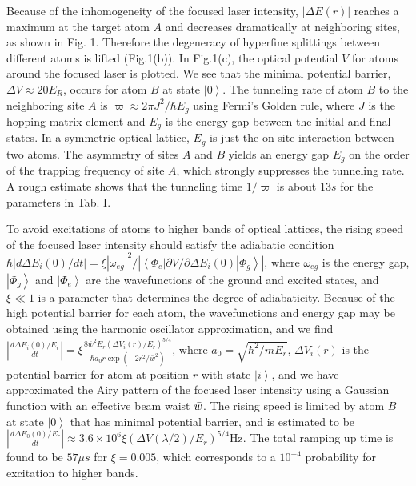 \documentclass[pra,aps,showpacs,twocolumn]{revtex4}
\begin{document}
Because of the inhomogeneity of the focused laser intensity, $\left\vert
\Delta E\left( r\right) \right\vert $ reaches a maximum at the target atom $%
A $ and decreases dramatically at neighboring sites, as shown in Fig. 1.
Therefore the degeneracy of hyperfine splittings between different atoms is
lifted (Fig.1(b)). In Fig.1(c), the optical potential $V$ for atoms around
the focused laser is plotted. We see that the minimal potential barrier, $%
\Delta V\approx 20E_{R}$, occurs for atom $B$ at state $\left\vert
0\right\rangle $. The tunneling rate of atom $B$ to the neighboring site $A$
is $\varpi \approx 2\pi J^{2}/\hbar E_{g}$ using Fermi's Golden rule, where $%
J$ is the hopping matrix element and $E_{g}$ is the energy gap between the
initial and final states. In a symmetric optical lattice, $E_{g}$ is just
the on-site interaction between two atoms. The asymmetry of sites $A$ and $B$
yields an energy gap $E_{g}$ on the order of the trapping frequency of site $%
A$, which strongly suppresses the tunneling rate. A rough estimate shows
that the tunneling time $1/\varpi $ is about $13s$ for the parameters in
Tab. I.

To avoid excitations of atoms to higher bands of optical lattices, the
rising speed of the focused laser intensity should satisfy the adiabatic
condition $\hbar \left\vert d\Delta E_{i}\left( 0\right) /dt\right\vert =\xi
\left\vert \omega _{eg}\right\vert ^{2}/\left\vert \left\langle \Phi
_{e}\right\vert \partial V/\partial \Delta E_{i}\left( 0\right) \left\vert
\Phi _{g}\right\rangle \right\vert $, where $\omega _{eg}$ is the energy
gap, $\left\vert \Phi _{g}\right\rangle $ and $\left\vert \Phi
_{e}\right\rangle $ are the wavefunctions of the ground and excited states,
and $\xi \ll 1$ is a parameter that determines the degree of adiabaticity.
Because of the high potential barrier for each atom, the wavefunctions and
energy gap may be obtained using the harmonic oscillator approximation, and
we find $\left\vert \frac{d\Delta E_{i}\left( 0\right) /E_{r}}{dt}%
\right\vert =\xi \frac{8\bar{w}^{2}E_{r}\left( \Delta V_{i}\left( r\right)
/E_{r}\right) ^{5/4}}{\hbar a_{0}r\exp \left( -2r^{2}/\bar{w}^{2}\right) }$,
where $a_{0}=\sqrt{\hbar ^{2}/mE_{r}}$, $\Delta V_{i}\left( r\right) $ is
the potential barrier for atom at position $r$ with state $\left\vert
i\right\rangle $, and we have approximated the Airy pattern of the focused
laser intensity using a Gaussian function with an effective beam waist $\bar{%
w}$. The rising speed is limited by atom $B$ at state $\left\vert
0\right\rangle $ that has minimal potential barrier, and is estimated to be $%
\left\vert \frac{d\Delta E_{0}\left( 0\right) /E_{r}}{dt}\right\vert \approx
3.6\times 10^{6}\xi \left( \Delta V\left( \lambda /2\right) /E_{r}\right)
^{5/4}$Hz. The total ramping up time is found to be $57\mu s$ for $\xi
=0.005 $, which corresponds to a $10^{-4}$ probability for excitation to
higher bands.
\end{document}
